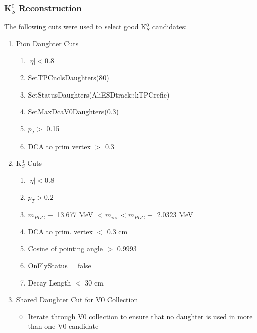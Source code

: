 \documentclass[../AnalysisNoteJBuxton.tex]{subfiles}
\begin{document}
\subsubsection{\texorpdfstring{K$^{0}_{S}$}{TEXT} Reconstruction}
\label{K0sReconstruction}

The following cuts were used to select good K$^{0}_{S}$ candidates:

\begin{enumerate}
 \item{Pion Daughter Cuts}
 \begin{enumerate}
  \item $|\eta| < 0.8$
  \item SetTPCnclsDaughters(80)
  \item SetStatusDaughters(AliESDtrack::kTPCrefic)
  \item SetMaxDcaV0Daughters(0.3)
  \item $p_{T} >$ 0.15
  \item DCA to prim vertex $>$ 0.3
 \end{enumerate}

 \item K$^{0}_{S}$ Cuts
 \begin{enumerate}
  \item $|\eta| < 0.8$
  \item $p_{T} > 0.2$
  \item $m_{PDG} -$ 13.677 MeV $< m_{inv} < m_{PDG} +$ 2.0323 MeV
  \item DCA to prim. vertex $<$ 0.3 cm
  \item Cosine of pointing angle $>$ 0.9993
  \item OnFlyStatus = false
  \item Decay Length $<$ 30 cm
 \end{enumerate}  
 \item Shared Daughter Cut for V0 Collection
 \begin{itemize}
  \item Iterate through V0 collection to ensure that no daughter is used in more than one V0 candidate
 \end{itemize} 
\end{enumerate}
\end{document}
